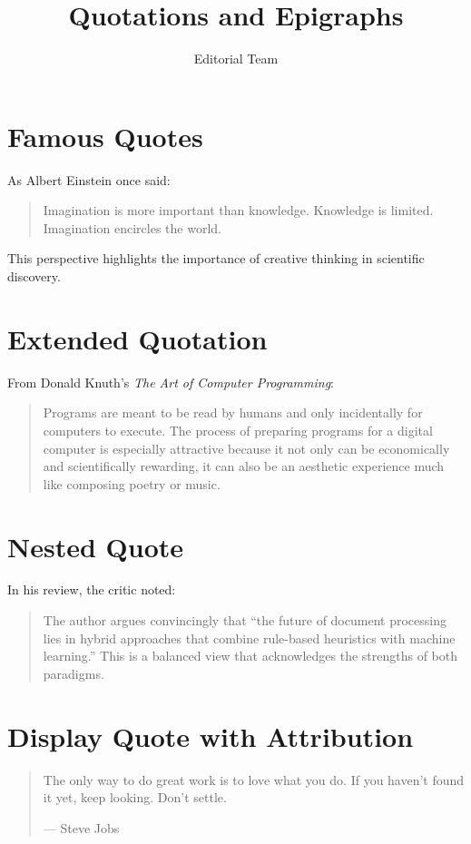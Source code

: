 \documentclass[12pt]{article}
\title{Quotations and Epigraphs}
\author{Editorial Team}
\begin{document}
\maketitle

\section{Famous Quotes}
As Albert Einstein once said:

\begin{quote}
Imagination is more important than knowledge. Knowledge is limited. Imagination
encircles the world.
\end{quote}

This perspective highlights the importance of creative thinking in scientific
discovery.

\section{Extended Quotation}
From Donald Knuth's \textit{The Art of Computer Programming}:

\begin{quotation}
Programs are meant to be read by humans and only incidentally for computers to
execute. The process of preparing programs for a digital computer is especially
attractive because it not only can be economically and scientifically rewarding,
it can also be an aesthetic experience much like composing poetry or music.
\end{quotation}

\section{Nested Quote}
In his review, the critic noted:

\begin{quote}
The author argues convincingly that ``the future of document processing lies in
hybrid approaches that combine rule-based heuristics with machine learning.''
This is a balanced view that acknowledges the strengths of both paradigms.
\end{quote}

\section{Display Quote with Attribution}
\begin{quote}
The only way to do great work is to love what you do. If you haven't found it
yet, keep looking. Don't settle.

\hfill --- Steve Jobs
\end{quote}
\end{document}
